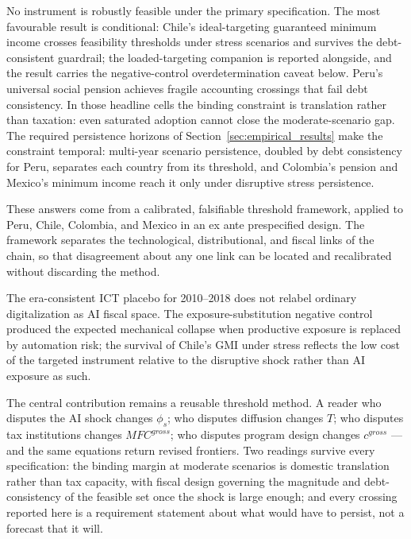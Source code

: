 \documentclass[11pt,a4paper]{article}
\begin{document}
No instrument is robustly feasible under the primary specification. The most favourable result is conditional: Chile's ideal-targeting guaranteed minimum income crosses feasibility thresholds under stress scenarios and survives the debt-consistent guardrail; the loaded-targeting companion is reported alongside, and the result carries the negative-control overdetermination caveat below. Peru's universal social pension achieves fragile accounting crossings that fail debt consistency. In those headline cells the binding constraint is translation rather than taxation: even saturated adoption cannot close the moderate-scenario gap. The required persistence horizons of Section~\ref{sec:empirical_results} make the constraint temporal: multi-year scenario persistence, doubled by debt consistency for Peru, separates each country from its threshold, and Colombia's pension and Mexico's minimum income reach it only under disruptive stress persistence.

These answers come from a calibrated, falsifiable threshold framework, applied to Peru, Chile, Colombia, and Mexico in an ex ante prespecified design. The framework separates the technological, distributional, and fiscal links of the chain, so that disagreement about any one link can be located and recalibrated without discarding the method.

The era-consistent ICT placebo for 2010--2018 does not relabel ordinary digitalization as AI fiscal space. The exposure-substitution negative control produced the expected mechanical collapse when productive exposure is replaced by automation risk; the survival of Chile's GMI under stress reflects the low cost of the targeted instrument relative to the disruptive shock rather than AI exposure as such.

The central contribution remains a reusable threshold method. A reader who disputes the AI shock changes $\phi_s$; who disputes diffusion changes $T$; who disputes tax institutions changes $MFC^{gross}$; who disputes program design changes $c^{gross}$ --- and the same equations return revised frontiers. Two readings survive every specification: the binding margin at moderate scenarios is domestic translation rather than tax capacity, with fiscal design governing the magnitude and debt-consistency of the feasible set once the shock is large enough; and every crossing reported here is a requirement statement about what would have to persist, not a forecast that it will.
\end{document}
